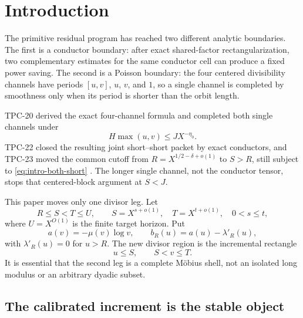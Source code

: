 \section{Introduction}
\label{sec:introduction}

The primitive residual program has reached two different analytic
boundaries.  The first is a conductor boundary: after exact
shared-factor rectangularization, two complementary estimates for the
same conductor cell can produce a fixed power saving.  The second is a
Poisson boundary: the four centered divisibility channels have periods
\([u,v]\), \(u\), \(v\), and \(1\), so a single channel is completed by
smoothness only when its period is shorter than the orbit length.

TPC-20 derived the exact four-channel formula and completed both single
channels under
\begin{equation}
 H\max(u,v)\le JX^{-\eta_0}.
 \label{eq:intro-both-short}
\end{equation}
TPC-22 closed the resulting joint short--short packet by exact
conductors, and TPC-23 moved the common cutoff from
\(R=X^{1/2-\delta+o(1)}\) to \(S>R\), still subject to
\eqref{eq:intro-both-short}
\citep{WangTPC20,WangTPC22,WangTPC23}.  The longer single channel, not
the conductor tensor, stops that centered-block argument at \(S<J\).

This paper moves only one divisor leg.  Let
\begin{equation}
 R\le S<T\le U,\qquad
 S=X^{s+o(1)},\quad T=X^{t+o(1)},\quad 0<s\le t,
 \label{eq:intro-ST}
\end{equation}
where \(U=X^{O(1)}\) is the finite target horizon.  Put
\[
 a(v)=-\mu(v)\log v,
 \qquad
 b_R(u)=a(u)-\lambda'_R(u),
\]
with \(\lambda'_R(u)=0\) for \(u>R\).  The new divisor region is the
incremental rectangle
\begin{equation}
 u\le S,\qquad S<v\le T.
 \label{eq:intro-mixed-shell}
\end{equation}
It is essential that the second leg is a complete M\"obius shell,
not an isolated long modulus or an arbitrary dyadic subset.

\subsection{The calibrated increment is the stable object}

